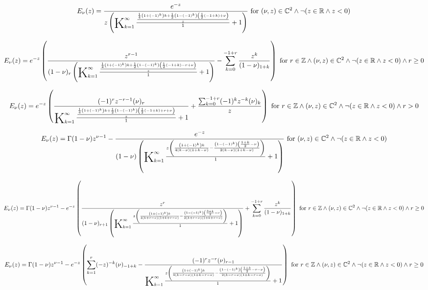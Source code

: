\documentclass{article}
\newcommand{\bigK}{\mathop{\raisebox{-5pt}{\huge K}}}
\begin{document}
\[E_{\nu }(z)=\frac{e^{-z}}{z \left(\bigK_{k=1}^{\infty}\frac{\frac{\frac{1}{4} \left(1+(-1)^k\right) k+\frac{1}{2} \left(1-(-1)^k\right) \left(\frac{1}{2} (-1+k)+\nu \right)}{z}}{1}+1\right)}\text{ for }(\nu ,z)\in \mathbb{C}^2\land \neg (z\in \mathbb{R}\land z<0)\] 

\[E_{\nu }(z)=e^{-z} \left(\frac{z^{r-1}}{(1-\nu )_r \left(\bigK_{k=1}^{\infty}\frac{\frac{\frac{1}{4} \left(1+(-1)^k\right) k+\frac{1}{2} \left(1-(-1)^k\right) \left(\frac{1}{2} (-1+k)-r+\nu \right)}{z}}{1}+1\right)}-\sum _{k=0}^{-1+r} \frac{z^k}{(1-\nu )_{1+k}}\right)\text{ for }r\in \mathbb{Z}\land (\nu ,z)\in \mathbb{C}^2\land \neg (z\in \mathbb{R}\land z<0)\land r\geq 0\] 

\[E_{\nu }(z)=e^{-z} \left(\frac{(-1)^r z^{-r-1} (\nu )_r}{\bigK_{k=1}^{\infty}\frac{\frac{\frac{1}{4} \left(1+(-1)^k\right) k+\frac{1}{2} \left(1-(-1)^k\right) \left(\frac{1}{2} (-1+k)+r+\nu \right)}{z}}{1}+1}+\frac{\sum _{k=0}^{-1+r} (-1)^k z^{-k} (\nu )_k}{z}\right)\text{ for }r\in \mathbb{Z}\land (\nu ,z)\in \mathbb{C}^2\land \neg (z\in \mathbb{R}\land z<0)\land r>0\] 

\[E_{\nu }(z)=\Gamma (1-\nu ) z^{\nu -1}-\frac{e^{-z}}{(1-\nu ) \left(\bigK_{k=1}^{\infty}\frac{z \left(\frac{\left(1+(-1)^k\right) k}{4 (k-\nu ) (1+k-\nu )}-\frac{\left(1-(-1)^k\right) \left(\frac{1+k}{2}-\nu \right)}{2 (k-\nu ) (1+k-\nu )}\right)}{1}+1\right)}\text{ for }(\nu ,z)\in \mathbb{C}^2\land \neg (z\in \mathbb{R}\land z<0)\] 

\[E_{\nu }(z)=\Gamma (1-\nu ) z^{\nu -1}-e^{-z} \left(\frac{z^r}{(1-\nu )_{r+1} \left(\bigK_{k=1}^{\infty}\frac{z \left(\frac{\left(1+(-1)^k\right) k}{4 (k+r-\nu ) (1+k+r-\nu )}-\frac{\left(1-(-1)^k\right) \left(\frac{3+k}{2}-\nu \right)}{2 (k+r-\nu ) (1+k+r-\nu )}\right)}{1}+1\right)}+\sum _{k=0}^{-1+r} \frac{z^k}{(1-\nu )_{1+k}}\right)\text{ for }r\in \mathbb{Z}\land (\nu ,z)\in \mathbb{C}^2\land \neg (z\in \mathbb{R}\land z<0)\land r\geq 0\] 

\[E_{\nu }(z)=\Gamma (1-\nu ) z^{\nu -1}-e^{-z} \left(\sum _{k=1}^r (-z)^{-k} (\nu )_{-1+k}-\frac{(-1)^r z^{-r} (\nu )_{r-1}}{\bigK_{k=1}^{\infty}\frac{z \left(\frac{\left(1+(-1)^k\right) k}{4 (k-r-\nu ) (1+k-r-\nu )}-\frac{\left(1-(-1)^k\right) \left(\frac{1+k}{2}-r-\nu \right)}{2 (k-r-\nu ) (1+k-r-\nu )}\right)}{1}+1}\right)\text{ for }r\in \mathbb{Z}\land (\nu ,z)\in \mathbb{C}^2\land \neg (z\in \mathbb{R}\land z<0)\land r\geq 0\] 
\end{document}
